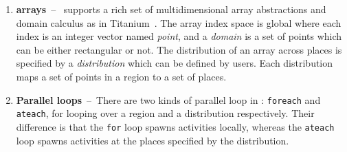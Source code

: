 \begin{enumerate}
\item{\bf \Xten{} arrays}~--~\Xten{} supports a rich set of multidimensional array abstractions and domain calculus as in Titanium~\cite{titaniumDoc}. The array index space is global where each index is an integer vector named {\em point}, and a {\em domain} is a set of points which can be either rectangular or not. The distribution of an array across places is specified by a {\em distribution} which can be defined by users. Each distribution maps a set of points in a region to a set of places. 



\item{\bf Parallel loops}~--~There are two kinds of parallel loop in \Xten{}: {\tt foreach} and {\tt ateach}, for looping over a region and a distribution respectively. Their difference is that the {\tt for} loop spawns activities locally, whereas the {\tt ateach} loop spawns activities at the places specified by the distribution. 



\end{enumerate}
